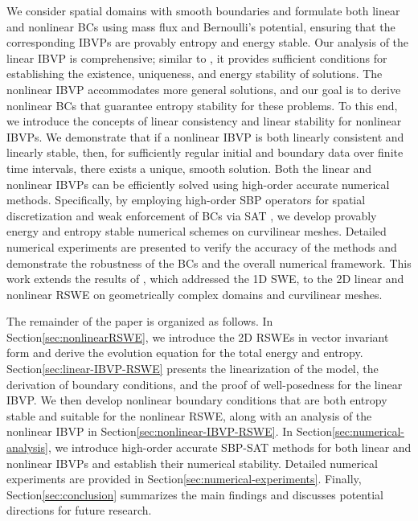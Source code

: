 \documentclass{article}
\numberwithin{equation}{section}
\theoremstyle{definition}
\begin{document}
We consider spatial domains with smooth boundaries and formulate both linear and nonlinear BCs using mass flux and Bernoulli's potential, ensuring that the corresponding IBVPs are provably entropy and energy stable. Our analysis of the linear IBVP is comprehensive; similar to \cite{GHADER20141, gustafsson1995time}, it provides sufficient conditions for establishing the existence, uniqueness, and energy stability of solutions.
%
The nonlinear IBVP accommodates more general solutions, and our goal is to derive nonlinear BCs that guarantee entropy stability for these problems. To this end, we introduce the concepts of linear consistency and linear stability for nonlinear IBVPs. We demonstrate that if a nonlinear IBVP is both linearly consistent and linearly stable, then, for sufficiently regular initial and boundary data over finite time intervals, there exists a unique, smooth solution.
%
Both the linear and nonlinear IBVPs can be efficiently solved using high-order accurate numerical methods. Specifically, by employing high-order SBP operators \cite{fernandez2014review, svard2014review, BStrand1994, gassner2013skew} for spatial discretization and weak enforcement of BCs via SAT \cite{carpenter1994time, Mattsson2003, HEW2025113624}, we develop provably energy and entropy stable numerical schemes on curvilinear meshes. 
%
Detailed numerical experiments are presented to verify the accuracy of the methods and demonstrate the robustness of the BCs and the overall numerical framework. This work extends the results of \cite{HEW2025113624}, which addressed the 1D SWE, to the 2D linear and nonlinear RSWE on geometrically complex domains and curvilinear meshes.
% 

The remainder of the paper is organized as follows. In Section\ref{sec:nonlinearRSWE}, we introduce the 2D RSWEs in vector invariant form and derive the evolution equation for the total energy and entropy. Section\ref{sec:linear-IBVP-RSWE} presents the linearization of the model, the derivation of boundary conditions, and the proof of well-posedness for the linear IBVP. We then develop nonlinear boundary conditions that are both entropy stable and suitable for the nonlinear RSWE, along with an analysis of the nonlinear IBVP in Section\ref{sec:nonlinear-IBVP-RSWE}. In Section\ref{sec:numerical-analysis}, we introduce high-order accurate SBP-SAT methods for both linear and nonlinear IBVPs and establish their numerical stability. Detailed numerical experiments are provided in Section\ref{sec:numerical-experiments}. Finally, Section\ref{sec:conclusion} summarizes the main findings and discusses potential directions for future research.
% 
\end{document}

